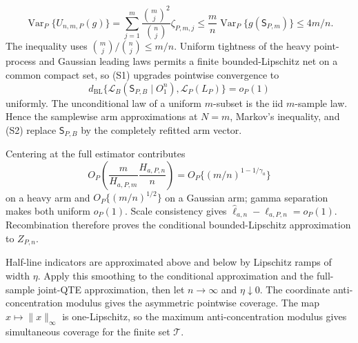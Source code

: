 \[
 \operatorname{Var}_P\{U_{n,m,P}(g)\}
 =\sum_{j=1}^m\frac{\binom mj^2}{\binom nj}\zeta_{P,m,j}
 \le\frac mn\operatorname{Var}_P\{g(\mathsf S_{P,m})\}
 \le4m/n.
\tag{S1}
\]
The inequality uses \(\binom mj/\binom nj\le m/n\).  Uniform tightness of the heavy point-process and Gaussian leading laws permits a finite bounded-Lipschitz net on a common compact set, so (S1) upgrades pointwise convergence to
\[
 d_{\mathrm{BL}}\{\mathcal L_B(\mathsf S_{P,B}\mid O_1^n),\mathcal L_P(L_P)\}=o_P(1)
\tag{S2}
\]
uniformly.  The unconditional law of a uniform \(m\)-subset is the iid \(m\)-sample law.  Hence the samplewise arm approximations at \(N=m\), Markov's inequality, and (S2) replace \(\mathsf S_{P,B}\) by the completely refitted arm vector.

Centering at the full estimator contributes
\[
 O_P\!\left(\frac m{H_{a,P,m}}\frac{H_{a,P,n}}n\right)
 =O_P\{(m/n)^{1-1/\gamma_a}\}
\]
on a heavy arm and \(O_P\{(m/n)^{1/2}\}\) on a Gaussian arm; gamma separation makes both uniform \(o_P(1)\).  Scale consistency gives \(\widehat\ell_{a,n}-\ell_{a,P,n}=o_P(1)\).  Recombination therefore proves the conditional bounded-Lipschitz approximation to \(Z_{P,n}\).

Half-line indicators are approximated above and below by Lipschitz ramps of width \(\eta\).  Apply this smoothing to the conditional approximation and the full-sample joint-QTE approximation, then let \(n\to\infty\) and \(\eta\downarrow0\).  The coordinate anti-concentration modulus gives the asymmetric pointwise coverage.  The map \(x\mapsto\|x\|_\infty\) is one-Lipschitz, so the maximum anti-concentration modulus gives simultaneous coverage for the finite set \(\mathcal T\).

